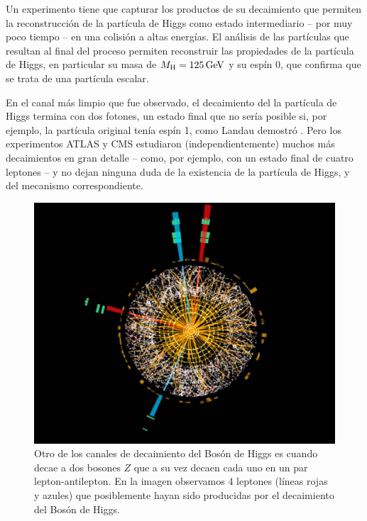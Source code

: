 Un experimento tiene que capturar los productos de su decaimiento
que permiten la reconstrucci\'on de la part\'icula de Higgs como
estado intermediario -- por muy poco tiempo -- en una colisi\'on a
altas energ\'ias. El an\'alisis de las part\'iculas que resultan al
final del proceso permiten reconstruir las propiedades de la
part\'icula de Higgs, en particular su masa de $M_{\rm H} = 125\,
{\rm GeV}$ y su esp\'in 0, que confirma que se trata de una part\'icula
escalar.



En el canal m\'as limpio que fue observado, el decaimiento del la
part\'icula de Higgs termina con dos fotones, un estado final que
no ser\'ia posible si, por ejemplo, la part\'icula original
ten\'ia esp\'in 1, como Landau demostr\'o \cite{Landau}.
Pero los experimentos ATLAS y CMS estudiaron (independientemente)
muchos m\'as decaimientos en gran detalle -- como, por ejemplo,
con un estado final de cuatro leptones -- y no dejan ninguna duda
de la existencia de la part\'icula de Higgs, y del mecanismo
correspondiente.


\begin{figure}
	\centering
	\includegraphics[scale=0.2]{images/atlas-higgs.jpg}
	\caption{Otro de los canales de decaimiento del Bos\'on de  Higgs es cuando decae a dos bosones $Z$ que a su vez decaen cada uno en un par lepton-antilepton. En la imagen observamos 4 leptones (l\'ineas rojas y azules) que posiblemente hayan sido producidas por el decaimiento del Bos\'on de Higgs.}
\end{figure}

